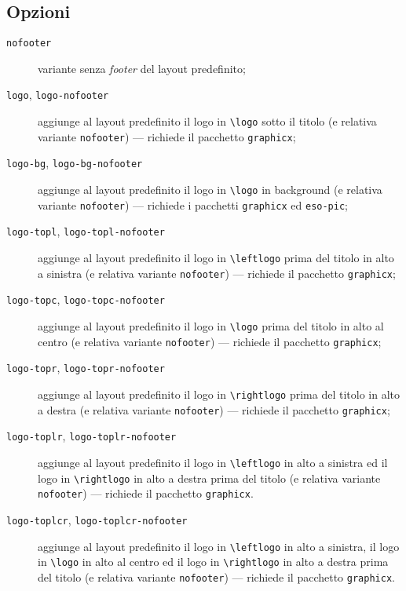 \documentclass[a4paper,oneside,centered,noparindent,noparskip]{bookest}
\begin{document}
\subsection{Opzioni}\label{copertinaopzioni}
\begin{description}
 \item[\texttt{nofooter}] variante senza \emph{footer} del layout predefinito;
 \item[\texttt{logo}, \texttt{logo-nofooter}] aggiunge al layout predefinito il logo in \texttt{\textbackslash logo} sotto il titolo (e relativa variante \texttt{nofooter}) --- richiede il pacchetto \texttt{graphicx};
 \item[\texttt{logo-bg}, \texttt{logo-bg-nofooter}] aggiunge al layout predefinito il logo in \texttt{\textbackslash logo} in background (e relativa variante \texttt{nofooter}) --- richiede i pacchetti \texttt{graphicx} ed \texttt{eso-pic};
 \item[\texttt{logo-topl}, \texttt{logo-topl-nofooter}] aggiunge al layout predefinito il logo in \texttt{\textbackslash leftlogo} prima del titolo in alto a sinistra (e relativa variante \texttt{nofooter}) --- richiede il pacchetto \texttt{graphicx};
 \item[\texttt{logo-topc}, \texttt{logo-topc-nofooter}] aggiunge al layout predefinito il logo in \texttt{\textbackslash logo} prima del titolo in alto al centro (e relativa variante \texttt{nofooter}) --- richiede il pacchetto \texttt{graphicx};
 \item[\texttt{logo-topr}, \texttt{logo-topr-nofooter}] aggiunge al layout predefinito il logo in \texttt{\textbackslash rightlogo} prima del titolo in alto a destra (e relativa variante \texttt{nofooter}) --- richiede il pacchetto \texttt{graphicx};
 \item[\texttt{logo-toplr}, \texttt{logo-toplr-nofooter}] aggiunge al layout predefinito il logo in \texttt{\textbackslash leftlogo} in alto a sinistra ed il logo in \texttt{\textbackslash rightlogo} in alto a destra prima del titolo (e relativa variante \texttt{nofooter}) --- richiede il pacchetto \texttt{graphicx}.
 \item[\texttt{logo-toplcr}, \texttt{logo-toplcr-nofooter}] aggiunge al layout predefinito il logo in \texttt{\textbackslash leftlogo} in alto a sinistra, il logo in \texttt{\textbackslash logo} in alto al centro ed il logo in \texttt{\textbackslash rightlogo} in alto a destra prima del titolo (e relativa variante \texttt{nofooter}) --- richiede il pacchetto \texttt{graphicx}.
\end{description}
\end{document}
